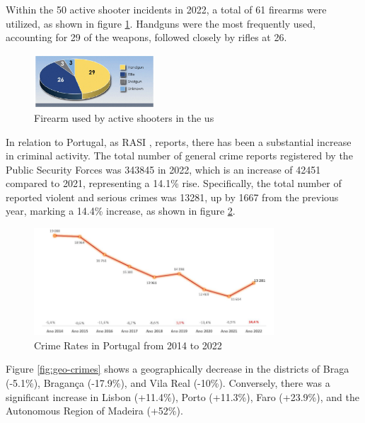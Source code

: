 Within the 50 active shooter incidents in 2022, a total of 61 firearms were utilized, as shown in figure \ref{fig:fbi-firearms}. Handguns were the most frequently used, accounting for 29 of the weapons, followed closely by rifles at 26.

\begin{figure}[h]
    \centering 
    \includegraphics[width=0.4\textwidth]{figs/firearms.png} 
    \caption{Firearm used by active shooters in the \ac{us} \cite{rfc37}}
    \label{fig:fbi-firearms}
\end{figure}

\newpage
In relation to Portugal, as RASI  \cite{rfc41}, reports, there has been a substantial 
increase in criminal activity. The total number of general crime reports registered 
by the Public Security Forces was 343845 in 2022, which is an increase of 42451 compared to 2021, 
representing a 14.1\% rise. Specifically, the total number of reported violent and serious crimes was 
13281, up by 1667 from the previous year, marking a 14.4\% increase, as shown in figure \ref{fig:crimes-portugal}.

\begin{figure}[h]
    \centering 
    \includegraphics[width=0.8\textwidth]{figs/crimes-portugal.png} 
    \caption{Crime Rates in Portugal from 2014 to 2022 \cite{rfc41}}
    \label{fig:crimes-portugal}
\end{figure}

Figure \ref{fig:geo-crimes} shows a geographically decrease in the districts of Braga (-5.1\%), Bragança (-17.9\%), and Vila Real (-10\%). Conversely, there was a significant increase in Lisbon (+11.4\%), Porto (+11.3\%), Faro (+23.9\%), and the Autonomous Region of Madeira (+52\%).

